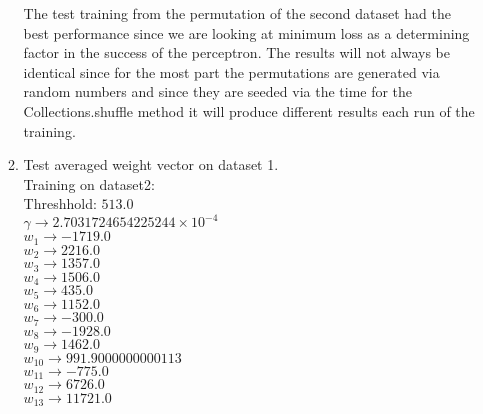 \begin{enumerate}
\begin{enumerate}
					\textnormal{The test training from the permutation of the second dataset had the best performance since we are looking at minimum loss as a determining factor in the success of the perceptron.  The results will not always be identical since for the most part the permutations are generated via random numbers and since they are seeded via the time for the Collections.shuffle method it will produce different results each run of the training. } \\
				\item{Test averaged weight vector on dataset 1.} \\
					Training on dataset2: \\
					\textnormal{Threshhold:} \( 513.0 \) \\
					\( \gamma \rightarrow 2.7031724654225244 \times 10^{-4} \) \\
					\( w_{1} \rightarrow -1719.0 \) \\
					\( w_{2} \rightarrow 2216.0 \) \\
					\( w_{3} \rightarrow 1357.0 \) \\
					\( w_{4} \rightarrow 1506.0 \) \\
					\( w_{5} \rightarrow 435.0 \) \\
					\( w_{6} \rightarrow 1152.0 \) \\
					\( w_{7} \rightarrow -300.0 \) \\
					\( w_{8} \rightarrow -1928.0 \) \\
					\( w_{9} \rightarrow 1462.0 \) \\
					\( w_{10} \rightarrow 991.9000000000113 \) \\
					\( w_{11} \rightarrow -775.0 \) \\
					\( w_{12} \rightarrow 6726.0 \) \\
					\( w_{13} \rightarrow 11721.0 \) \\ \\
					

\end{enumerate}
\end{enumerate}
